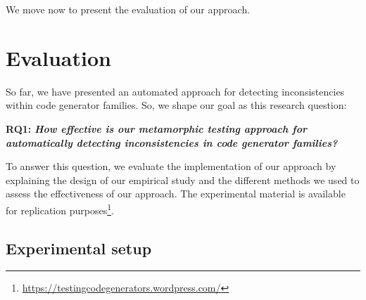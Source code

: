 
We move now to present the evaluation of our approach.


\section{Evaluation}
\label{sec:cg_evaluation}
So far, we have presented an automated approach for detecting inconsistencies within code generator families. So, we shape our goal as this research question:

\textbf{RQ1: } 
\textbf{\textit{How effective is our metamorphic testing approach for automatically detecting inconsistencies in code generator families?}} 

To answer this question, we evaluate the implementation of our approach by explaining the design of our empirical study and the different methods we used to assess the effectiveness of our approach. 
The experimental material is available for replication purposes\footnote{\url{https://testingcodegenerators.wordpress.com/}}.
\subsection{Experimental setup}
